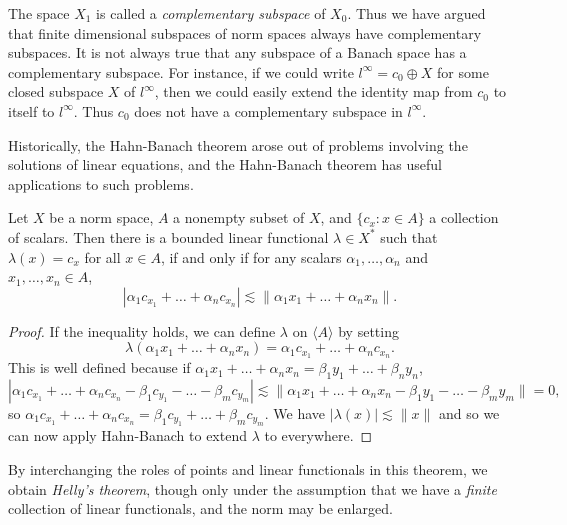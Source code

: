 The space $X_1$ is called a \emph{complementary subspace} of $X_0$. Thus we have argued that finite dimensional subspaces of norm spaces always have complementary subspaces. It is not always true that any subspace of a Banach space has a complementary subspace. For instance, if we could write $l^\infty = c_0 \oplus X$ for some closed subspace $X$ of $l^\infty$, then we could easily extend the identity map from $c_0$ to itself to $l^\infty$. Thus $c_0$ does not have a complementary subspace in $l^\infty$.

Historically, the Hahn-Banach theorem arose out of problems involving the solutions of linear equations, and the Hahn-Banach theorem has useful applications to such problems.

\begin{theorem}
    Let $X$ be a norm space, $A$ a nonempty subset of $X$, and $\{ c_x : x \in A \}$ a collection of scalars. Then there is a bounded linear functional $\lambda \in X^*$ such that $\lambda(x) = c_x$ for all $x \in A$, if and only if for any scalars $\alpha_1,\dots,\alpha_n$ and $x_1, \dots, x_n \in A$,
    \[ |\alpha_1 c_{x_1} + \dots + \alpha_n c_{x_n}| \lesssim \| \alpha_1 x_1 + \dots + \alpha_n x_n \|. \]
\end{theorem}
\begin{proof}
    If the inequality holds, we can define $\lambda$ on $\langle A \rangle$ by setting
    \[ \lambda(\alpha_1 x_1 + \dots + \alpha_n x_n) = \alpha_1 c_{x_1} + \dots + \alpha_n c_{x_n}. \]
    This is well defined because if $\alpha_1 x_1 + \dots + \alpha_n x_n = \beta_1 y_1 + \dots + \beta_n y_n$,
    \[ |\alpha_1 c_{x_1} + \dots + \alpha_n c_{x_n} - \beta_1 c_{y_1} - \dots - \beta_m c_{y_m} | \lesssim \| \alpha_1 x_1 + \dots + \alpha_n x_n - \beta_1 y_1 - \dots - \beta_m y_m \| = 0, \]
    so $\alpha_1 c_{x_1} + \dots + \alpha_n c_{x_n} = \beta_1 c_{y_1} + \dots + \beta_m c_{y_m}$. We have $|\lambda(x)| \lesssim \| x \|$ and so we can now apply Hahn-Banach to extend $\lambda$ to everywhere.
\end{proof}

By interchanging the roles of points and linear functionals in this theorem, we obtain \emph{Helly's theorem}, though only under the assumption that we have a \emph{finite} collection of linear functionals, and the norm may be enlarged.

